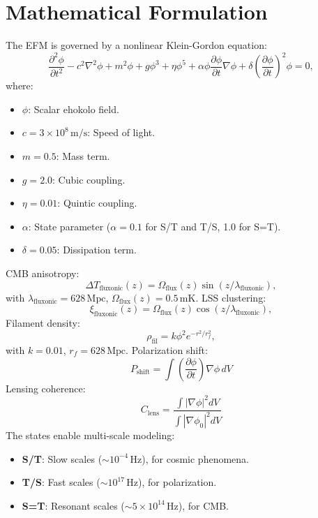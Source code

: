 \documentclass[11pt]{article}
\begin{document}
\section{Mathematical Formulation}
The EFM is governed by a nonlinear Klein-Gordon equation:
\begin{equation}
\frac{\partial^2 \phi}{\partial t^2} - c^2 \nabla^2 \phi + m^2 \phi + g \phi^3 + \eta \phi^5 + \alpha \phi \frac{\partial \phi}{\partial t} \nabla \phi + \delta \left(\frac{\partial \phi}{\partial t}\right)^2 \phi = 0,
\end{equation}
where:
\begin{itemize}
    \item \(\phi\): Scalar ehokolo field.
    \item \(c = 3 \times 10^8 \, \text{m/s}\): Speed of light.
    \item \(m = 0.5\): Mass term.
    \item \(g = 2.0\): Cubic coupling.
    \item \(\eta = 0.01\): Quintic coupling.
    \item \(\alpha\): State parameter (\(\alpha = 0.1\) for S/T and T/S, 1.0 for S=T).
    \item \(\delta = 0.05\): Dissipation term.
\end{itemize}
CMB anisotropy:
\begin{equation}
\Delta T_{\text{fluxonic}}(z) = \Omega_{\text{flux}}(z) \sin(z / \lambda_{\text{fluxonic}}),
\end{equation}
with \(\lambda_{\text{fluxonic}} = 628 \, \text{Mpc}\), \(\Omega_{\text{flux}}(z) = 0.5 \, \text{mK}\).
LSS clustering:
\begin{equation}
\xi_{\text{fluxonic}}(z) = \Omega_{\text{flux}}(z) \cos(z / \lambda_{\text{fluxonic}}),
\end{equation}
Filament density:
\begin{equation}
\rho_{\text{fil}} = k \phi^2 e^{-r^2 / r_f^2},
\end{equation}
with \(k = 0.01\), \(r_f = 628 \, \text{Mpc}\). Polarization shift:
\begin{equation}
P_{\text{shift}} = \int \left( \frac{\partial \phi}{\partial t} \right) \nabla \phi \, dV
\end{equation}
Lensing coherence:
\begin{equation}
C_{\text{lens}} = \frac{\int |\nabla \phi|^2 dV}{\int |\nabla \phi_0|^2 dV}
\end{equation}
The states enable multi-scale modeling:
\begin{itemize}
    \item \textbf{S/T}: Slow scales (\(\sim 10^{-4} \, \text{Hz}\)), for cosmic phenomena.
    \item \textbf{T/S}: Fast scales (\(\sim 10^{17} \, \text{Hz}\)), for polarization.
    \item \textbf{S=T}: Resonant scales (\(\sim 5 \times 10^{14} \, \text{Hz}\)), for CMB.
\end{itemize}
\end{document}
